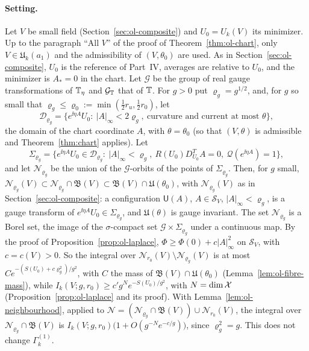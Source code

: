\paragraph{Setting.} Let $V$ be small field (Section~\ref{sec:ol-composite}) and $U_0=U_k(V)$ its minimizer. Up to the paragraph ``All $V$'' of the proof of Theorem~\ref{thm:ol-chart}, only $V\in\mathfrak U_k(a_1)$ and the admissibility of $(V,\theta_0)$ are used. As in Section~\ref{sec:ol-composite}, $U_0$ is the reference of Part~IV, averages are relative to $U_0$, and the minimizer is $A_*=0$ in the chart. Let $\mathcal G$ be the group of real gauge transformations of $\mathbb T_\eta$ and $\mathcal G_\mathbb T$ that of $\mathbb T$. For $g>0$ put $\varrho_g=g^{1/2}$, and, for $g$ so small that $\varrho_g\le\varrho_0:=\min(\frac12r_u,\frac12r_0)$, let
\[
\mathcal D_{\varrho_g}=\big\{e^{\ii\eta A}U_0:\ |A|_\infty<2\varrho_g,\ \text{curvature and current at most }\theta\big\},
\]
the domain of the chart coordinate $A$, with $\theta=\theta_0$ (so that $(V,\theta)$ is admissible and Theorem~\ref{thm:chart} applies). Let
\[
\Sigma_{\varrho_g}=\big\{e^{\ii\eta A}U_0\in\mathcal D_{\varrho_g}:\ |A|_\infty<\varrho_g,\ R(U_0)D^T_{U_0}A=0,\ \mathcal Q(e^{\ii\eta A})=1\big\},
\]
and let $\mathscr N_{\varrho_g}$ be the union of the $\mathcal G$-orbits of the points of $\Sigma_{\varrho_g}$. Then, for $g$ small, $\mathscr N_{\varrho_g}(V)\subset\mathscr N_{\varrho_g}\cap\mathfrak B(V)\subset\mathfrak B(V)\cap\mathfrak U(\theta_0)$, with $\mathscr N_{\varrho_g}(V)$ as in Section~\ref{sec:ol-composite}: a configuration $\mathsf U(A)$, $A\in\mathcal S_V$, $|A|_\infty<\varrho_g$, is a gauge transform of $e^{\ii\eta A}U_0\in\Sigma_{\varrho_g}$, and $\mathfrak U(\theta)$ is gauge invariant. The set $\mathscr N_{\varrho_g}$ is a Borel set, the image of the $\sigma$-compact set $\mathcal G\times\Sigma_{\varrho_g}$ under a continuous map. By the proof of Proposition~\ref{prop:ol-laplace}, $\Phi\ge\Phi(0)+c|A|_\infty^2$ on $\mathcal S_V$, with $c=c(V)>0$. So the integral over $\mathscr N_{r_0}(V)\setminus\mathscr N_{\varrho_g}(V)$ is at most $Ce^{-(S(U_0)+c\varrho_g^2)/g^2}$, with $C$ the mass of $\mathfrak B(V)\cap\mathfrak U(\theta_0)$ (Lemma~\ref{lem:ol-fibre-mass}), while $I_k(V;g,r_0)\ge c'g^Ne^{-S(U_0)/g^2}$, with $N=\dim\mathcal X$ (Proposition~\ref{prop:ol-laplace} and its proof). With Lemma~\ref{lem:ol-neighbourhood}, applied to $\mathscr N=(\mathscr N_{\varrho_g}\cap\mathfrak B(V))\cup\mathscr N_{r_0}(V)$, the integral over $\mathscr N_{\varrho_g}\cap\mathfrak B(V)$ is $I_k(V;g,r_0)\big(1+O(g^{-N}e^{-c/g})\big)$, since $\varrho_g^2=g$. This does not change $\Gamma^{(1)}_k$.

